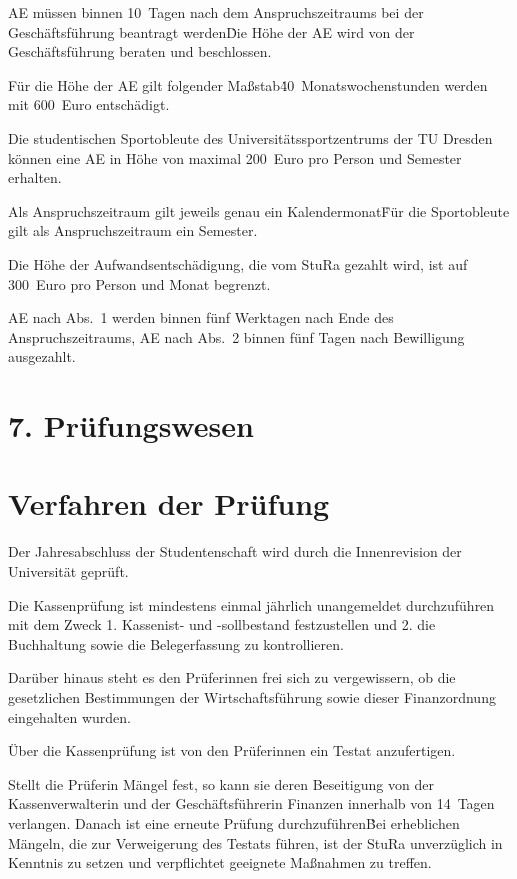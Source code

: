 \Abs \Satz AE müssen binnen 10~Tagen nach dem Anspruchszeitraums bei der Geschäftsführung beantragt werden\. Die Höhe der AE wird von der Geschäftsführung beraten und beschlossen.

\Abs \Satz Für die Höhe der AE gilt folgender Maßstab\. 40~Monatswochenstunden werden mit 600~Euro entschädigt.

\Abs \Satz Die studentischen Sportobleute des Universitätssportzentrums der TU Dresden können eine AE in Höhe von maximal 200~Euro pro Person und Semester erhalten.

\Abs \Satz Als Anspruchszeitraum gilt jeweils genau ein Kalendermonat\. Für die Sportobleute gilt als Anspruchszeitraum ein Semester.

\Abs \Satz Die Höhe der Aufwandsentschädigung, die vom StuRa gezahlt wird, ist auf 300~Euro pro Person und Monat begrenzt.

\Abs \Satz AE nach Abs.~1 werden binnen fünf Werktagen nach Ende des Anspruchszeitraums, AE nach Abs.~2 binnen fünf Tagen nach Bewilligung ausgezahlt.


\section*{7. Prüfungswesen}



\section{Verfahren der Prüfung}

\Abs \Satz Der Jahresabschluss der Studentenschaft wird durch die Innenrevision der Universität geprüft.

\Abs \Satz Die Kassenprüfung ist mindestens einmal jährlich unangemeldet durchzuführen mit dem Zweck
1. Kassenist- und -sollbestand festzustellen und
2. die Buchhaltung sowie die Belegerfassung zu kontrollieren.

\Abs \Satz Darüber hinaus steht es den Prüferinnen frei sich zu vergewissern, ob die gesetzlichen Bestimmungen der Wirtschaftsführung sowie dieser Finanzordnung eingehalten wurden.

\Abs \Satz Über die Kassenprüfung ist von den Prüferinnen ein Testat anzufertigen.

\Abs \Satz Stellt die Prüferin Mängel fest, so kann sie deren Beseitigung von der Kassenverwalterin und der Geschäftsführerin Finanzen innerhalb von 14~Tagen verlangen. Danach ist eine erneute Prüfung durchzuführen\. Bei erheblichen Mängeln, die zur Verweigerung des Testats führen, ist der StuRa unverzüglich in Kenntnis zu setzen und verpflichtet geeignete Maßnahmen zu treffen.

